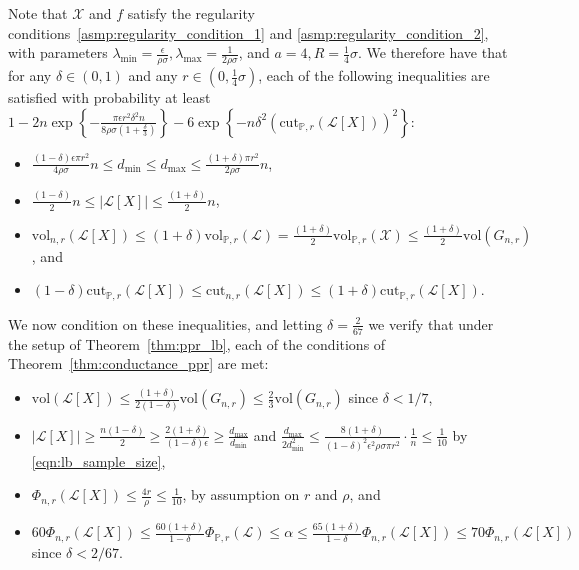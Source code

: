 \documentclass[11pt,twoside]{article}
\newcommand{\set}[1]{\left\{#1\right\}}
\newcommand{\vol}{\mathrm{vol}}
\newcommand{\cut}{\mathrm{cut}}
\newcommand{\abs}[1]{\left \lvert #1 \right \rvert}
\newcommand{\1}{\mathbf{1}}
\newcommand{\Xbf}{X}             %
\newcommand{\Pbb}{\mathbb{P}}
\begin{document}
Note that $\mathcal{X}$ and $f$ satisfy the regularity conditions~\ref{asmp:regularity_condition_1} and \ref{asmp:regularity_condition_2}, with parameters $\lambda_{\min} = \frac{\epsilon}{\rho\sigma}, \lambda_{\max} = \frac{1}{2\rho\sigma}$, and $a = 4, R = \frac{1}{4}\sigma$. We therefore have that for any $\delta \in (0,1)$ and any $r \in (0,\frac{1}{4}\sigma)$, each of the following inequalities are satisfied with probability at least $1 - 2n\exp\set{-\frac{\pi\epsilon r^2\delta^2n}{8 \rho \sigma(1 + \frac{\delta}{3})}} - 6 \exp\set{-n\delta^2(\cut_{\Pbb,r}(\mathcal{L}[\Xbf]))^2}$: 
\begin{itemize}
	\item $\frac{(1 - \delta)\epsilon \pi r^2}{4\rho \sigma}n \leq d_{\min} \leq d_{\max} \leq \frac{(1 + \delta)\pi r^2}{2\rho \sigma }n$, 
	\item $\frac{(1 - \delta)}{2} n \leq \abs{\mathcal{L}[\Xbf]} \leq \frac{(1 + \delta)}{2} n$, 
	\item $\vol_{n,r}(\mathcal{L}[\Xbf]) \leq (1 + \delta)\vol_{\Pbb,r}(\mathcal{L}) = \frac{(1 + \delta)}{2} \vol_{\Pbb,r}(\mathcal{X}) \leq \frac{(1 + \delta)}{2} \vol(G_{n,r})$, and
	\item $(1 - \delta) \cut_{\Pbb,r}(\mathcal{L}[\Xbf]) \leq \cut_{n,r}(\mathcal{L}[\Xbf]) \leq (1 + \delta) \cut_{\Pbb,r}(\mathcal{L}[\Xbf])$.
\end{itemize}
We now condition on these inequalities, and letting $\delta = \frac{2}{67}$ we verify that under the setup of Theorem~\ref{thm:ppr_lb}, each of the conditions of Theorem~\ref{thm:conductance_ppr} are met:
\begin{itemize}
	\item $\vol(\mathcal{L}[X]) \leq \frac{(1 + \delta)}{2(1 - \delta)}\vol(G_{n,r}) \leq \frac{2}{3}\vol(G_{n,r})$ since $\delta < 1/7$,
	\item $\abs{\mathcal{L}[X]} \geq \frac{n(1 - \delta)}{2} \geq \frac{2(1 + \delta)}{(1 - \delta)\epsilon} \geq \frac{d_{\max}}{d_{\min}}$ and $\frac{d_{\max}}{2d_{\min}^2} \leq \frac{8(1 + \delta)}{(1 - \delta)^2 \epsilon^2 \rho \sigma \pi r^2} \cdot \frac{1}{n} \leq \frac{1}{10}$ by \eqref{eqn:lb_sample_size},
	\item $\Phi_{n,r}(\mathcal{L}[X]) \leq \frac{4r}{\rho} \leq \frac{1}{10}$, by assumption on $r$ and $\rho$, and
	\item $60\Phi_{n,r}(\mathcal{L}[X]) \leq \frac{60(1 + \delta)}{1 - \delta}\Phi_{\Pbb,r}(\mathcal{L}) \leq \alpha \leq \frac{65(1 + \delta)}{1 - \delta}\Phi_{n,r}(\mathcal{L}[X]) \leq 70\Phi_{n,r}(\mathcal{L}[X])$ since $\delta < 2/67$. 
\end{itemize}
\end{document}

